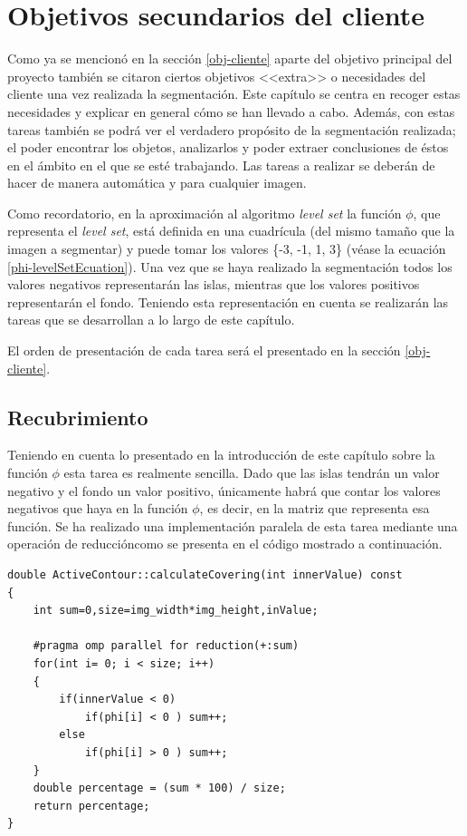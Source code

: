 \chapter{Objetivos secundarios del cliente}

Como ya se mencion\'{o} en la secci\'{o}n \ref{obj-cliente} aparte del objetivo principal del proyecto tambi\'{e}n se citaron ciertos objetivos <<extra>> o necesidades del cliente una vez realizada la segmentaci\'{o}n. Este cap\'{i}tulo se centra en recoger estas necesidades y explicar en general c\'{o}mo se han llevado a cabo. Adem\'{a}s, con estas tareas tambi\'{e}n se podr\'{a} ver el verdadero prop\'{o}sito de la segmentaci\'{o}n realizada; el poder encontrar los objetos, analizarlos y poder extraer conclusiones de \'{e}stos en el \'{a}mbito en el que se est\'{e} trabajando. Las tareas a realizar se deber\'{a}n de hacer de manera autom\'{a}tica y para cualquier imagen.

Como recordatorio, en la aproximaci\'{o}n al algoritmo \textit{level set} la funci\'{o}n $\phi$, que representa el \textit{level set}, est\'{a} definida en una cuadr\'{i}cula (del mismo tama\~{n}o que la imagen a segmentar) y puede tomar los valores \{-3, -1, 1, 3\} (v\'{e}ase la ecuaci\'{o}n \ref{phi-levelSetEcuation}). Una vez que se haya realizado la segmentaci\'{o}n todos los valores negativos representar\'{a}n las islas, mientras que los valores positivos representar\'{a}n el fondo. Teniendo esta representaci\'{o}n en cuenta se realizar\'{a}n las tareas que se desarrollan a lo largo de este cap\'{i}tulo.

El orden de presentaci\'{o}n de cada tarea ser\'{a} el presentado en la secci\'{o}n \ref{obj-cliente}.
\section{Recubrimiento}

Teniendo en cuenta lo presentado en la introducci\'{o}n de este cap\'{i}tulo sobre la funci\'{o}n $\phi$ esta tarea es realmente sencilla. Dado que las islas tendr\'{a}n un valor negativo y el fondo un valor positivo, \'{u}nicamente habr\'{a} que contar los valores negativos que haya en la funci\'{o}n $\phi$, es decir, en la matriz que representa esa funci\'{o}n. Se ha realizado una implementaci\'{o}n paralela de esta tarea mediante una operaci\'{o}n de reducci\'{o}n\protect\footnotemark como se presenta en el c\'{o}digo mostrado a continuaci\'{o}n. 
\begin{lstlisting}
double ActiveContour::calculateCovering(int innerValue) const
{
	int sum=0,size=img_width*img_height,inValue;
	
	#pragma omp parallel for reduction(+:sum)
	for(int i= 0; i < size; i++)
	{
		if(innerValue < 0)
			if(phi[i] < 0 )	sum++;
		else
			if(phi[i] > 0 )	sum++;
	}
	double percentage = (sum * 100) / size;
	return percentage;
}	
\end{lstlisting}
